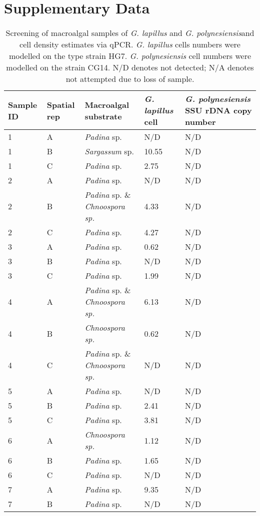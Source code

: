 \documentclass[12pt]{article}
\begin{document}
\section*{Supplementary Data}
\FloatBarrier
\begin{longtable}{ | p{1cm} | p{1cm} | p{3cm} | p{4cm} | p{4cm} | }
\caption{Screening of macroalgal samples of \emph{G. lapillus} and \emph{G. polynesiensis}and cell density estimates via qPCR. \emph{G. lapillus} cells numbers were modelled on the type strain HG7. \emph{G. polynesiensis} cell numbers were modelled on the strain CG14. N/D denotes not detected; N/A denotes not attempted due to loss of sample.}\\
\hline
\label{tbl:MacroalgaeTable}
\textbf{Sample ID}&\textbf{Spatial rep}&\textbf{Macroalgal substrate}&\textbf{\textit{G. lapillus} cell}&\textbf{\textit{G. polynesiensis} SSU rDNA copy number }\\
\hline
1&A&\emph{Padina} sp.&N/D&N/D\\
\hline
1&B&\emph{Sargassum} sp.&10.55
&N/D\\
\hline
1&C&\emph{Padina} sp.&2.75
&N/D\\
\hline
2&A&\emph{Padina} sp.&N/D&N/D\\
\hline
2&B&\emph{Padina} sp. \& \emph{Chnoospora sp.}&4.33
&N/D\\
\hline
2&C&\emph{Padina} sp.&4.27
&N/D\\
\hline
3&A&\emph{Padina} sp.&0.62
&N/D\\
\hline
3&B&\emph{Padina} sp.&N/D&N/D\\
\hline
3&C&\emph{Padina} sp.&1.99
&N/D\\
\hline
4&A&\emph{Padina} sp. \& \emph{Chnoospora sp.}&6.13
&N/D\\
\hline
4&B&\emph{Chnoospora sp.}&0.62
&N/D\\
\hline
4&C&\emph{Padina} sp. \& \emph{Chnoospora sp.}&N/D&N/D\\
\hline
5&A&\emph{Padina} sp.&N/D&N/D\\
\hline
5&B&\emph{Padina} sp.&2.41
&N/D\\
\hline
5&C&\emph{Padina} sp.&3.81
&N/D\\
\hline
6&A&\emph{Chnoospora sp.}&1.12
&N/D\\
\hline
6&B&\emph{Padina} sp.&1.65
&N/D\\
\hline
6&C&\emph{Padina} sp.&N/D&N/D\\
\hline
7&A&\emph{Padina} sp.&9.35
&N/D\\
\hline
7&B&\emph{Padina} sp.&N/D&N/D\\

\end{longtable}
\end{document}
